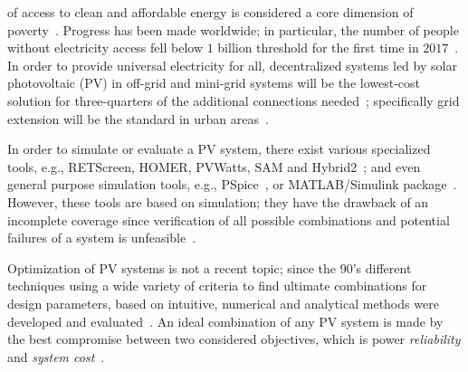 \documentclass[journal]{IEEEtran}
\begin{document}

 of access to clean and affordable energy is considered a core dimension of poverty~\cite{Hussein2012}. Progress has been made worldwide; in particular, the number of people without electricity access fell below $1$ billion threshold for the first time in $2017$~\cite{IEAweo2018}. In order to provide universal electricity for all, decentralized systems led by solar photovoltaic (PV) in off-grid and mini-grid systems will be the lowest-cost solution for three-quarters of the additional connections needed~\cite{Hussein2012}; specifically grid extension will be the standard in urban areas~\cite{IEAweo2018}.

In order to simulate or evaluate a PV system, there exist various specialized tools, e.g., RETScreen, HOMER, PVWatts, SAM and Hybrid2~\cite{Pradhan,Swarnkar,NRELDobos,NRELBlair,Mills}; and even general purpose simulation tools, e.g.,  PSpice~\cite{Gow1999}, or MATLAB/Simulink package~\cite{Benatiallah2017}. However, these tools are based on simulation; they have the drawback of an incomplete coverage  since verification of all possible combinations and potential failures of a system is unfeasible~\cite{ClarkeHV18}. 

Optimization of PV systems is not a recent topic; since the $90$'s different techniques using a wide variety of criteria to find ultimate combinations for design parameters, based on intuitive, numerical and analytical methods were developed and evaluated~\cite{Applasamy2011}. An ideal combination of any PV system is made by the best compromise between two considered objectives, which is power \textit{reliability} and \textit{system cost}~\cite{Alsadi2018}.
\end{document}
